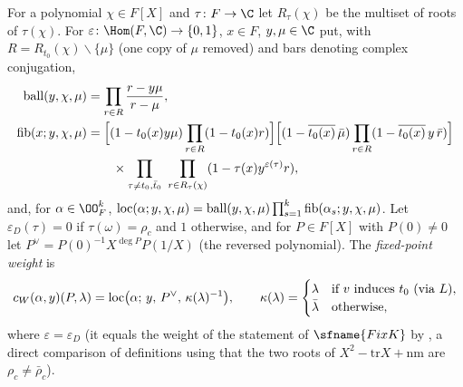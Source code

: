 \begin{definition}[Weights]\label{pf:ks2:def:weights}
For a polynomial $\chi\in F[X]$ and $\tau\colon F\to\C$ let $R_\tau(\chi)$ be the multiset of roots
of $\tau(\chi)$. For $\varepsilon\colon\Hom(F,\C)\to\{0,1\}$,
$x\in F$, $y,\mu\in\C$ put, with $R=R_{t_0}(\chi)\smallsetminus\{\mu\}$ (one copy of $\mu$
removed) and bars denoting complex conjugation,
\begin{align*}
\mathrm{ball}(y,\chi,\mu)&=\prod_{r\in R}\frac{r-y\mu}{r-\mu},\\
\mathrm{fib}(x;y,\chi,\mu)&=\Bigl[(1-t_0(x)y\mu)\prod_{r\in R}(1-t_0(x)r)\Bigr]
\Bigl[(1-\overline{t_0(x)}\,\bar\mu)\prod_{r\in R}(1-\overline{t_0(x)}\,y\,\bar r)\Bigr]\\
&\qquad\times\prod_{\tau\ne t_0,\bar t_0}\ \prod_{r\in R_\tau(\chi)}(1-\tau(x)y^{\varepsilon(\tau)}r),
\end{align*}
and, for $\alpha\in\kstwoOF^k$,
$\mathrm{loc}(\alpha;y,\chi,\mu)=\mathrm{ball}(y,\chi,\mu)\prod_{s=1}^k\mathrm{fib}(\alpha_s;y,\chi,\mu)$.
Let $\varepsilon_D(\tau)=0$ if $\tau(\omega)=\rho_c$ and $1$ otherwise,
and for $P\in F[X]$ with $P(0)\ne0$ let $P^\vee=P(0)^{-1}X^{\deg P}P(1/X)$ (the reversed polynomial). The \emph{fixed-point weight} is
\begin{equation}\label{pf:ks2:eq:cw}
c_W(\alpha,y)(P,\lambda)=\mathrm{loc}\bigl(\alpha;\,y,\,P^\vee,\,\kappa(\lambda)^{-1}\bigr),\qquad
\kappa(\lambda)=\begin{cases}\lambda&\text{if }v\text{ induces }t_0\text{ (via }L),\\ \bar\lambda&\text{otherwise,}\end{cases}
\end{equation}
where $\varepsilon=\varepsilon_D$ (it equals the weight of the statement of $\sfname{FixK}$ by
, a direct comparison of definitions using that the two
roots of $X^2-\mathrm{tr}X+\mathrm{nm}$ are $\rho_c\ne\bar\rho_c$).
\end{definition}

